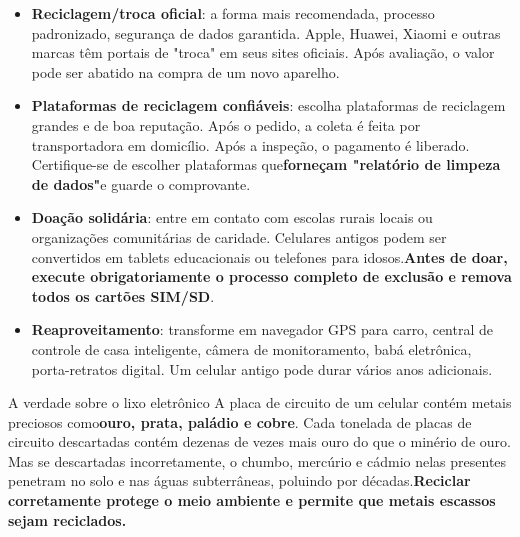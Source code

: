 \begin{itemize}
  \item \textbf{Reciclagem/troca oficial}: a forma mais recomendada, processo padronizado, segurança de dados garantida. Apple, Huawei, Xiaomi e outras marcas têm portais de "troca" em seus sites oficiais. Após avaliação, o valor pode ser abatido na compra de um novo aparelho.
  \item \textbf{Plataformas de reciclagem confiáveis}: escolha plataformas de reciclagem grandes e de boa reputação. Após o pedido, a coleta é feita por transportadora em domicílio. Após a inspeção, o pagamento é liberado. Certifique-se de escolher plataformas que\textbf{forneçam "relatório de limpeza de dados"}e guarde o comprovante.
  \item \textbf{Doação solidária}: entre em contato com escolas rurais locais ou organizações comunitárias de caridade. Celulares antigos podem ser convertidos em tablets educacionais ou telefones para idosos.\textbf{Antes de doar, execute obrigatoriamente o processo completo de exclusão e remova todos os cartões SIM/SD}.
  \item \textbf{Reaproveitamento}: transforme em navegador GPS para carro, central de controle de casa inteligente, câmera de monitoramento, babá eletrônica, porta-retratos digital. Um celular antigo pode durar vários anos adicionais.
\end{itemize}

\begin{tcbinfo}{A verdade sobre o lixo eletrônico}
A placa de circuito de um celular contém metais preciosos como\textbf{ouro, prata, paládio e cobre}. Cada tonelada de placas de circuito descartadas contém dezenas de vezes mais ouro do que o minério de ouro. Mas se descartadas incorretamente, o chumbo, mercúrio e cádmio nelas presentes penetram no solo e nas águas subterrâneas, poluindo por décadas.\textbf{Reciclar corretamente protege o meio ambiente e permite que metais escassos sejam reciclados.}

\end{tcbinfo}

